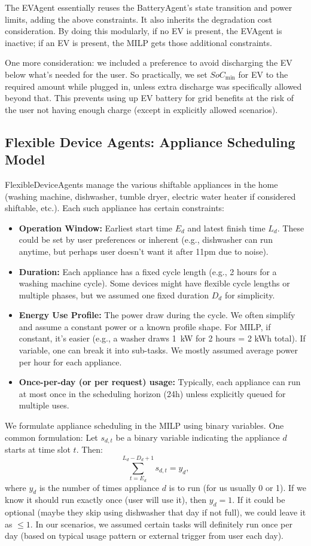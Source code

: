 \documentclass[12pt,a4paper]{article}
\begin{document}
The EVAgent essentially reuses the BatteryAgent’s state transition and power limits, adding the above constraints. It also inherits the degradation cost consideration. By doing this modularly, if no EV is present, the EVAgent is inactive; if an EV is present, the MILP gets those additional constraints.

One more consideration: we included a preference to avoid discharging the EV below what’s needed for the user. So practically, we set $SoC_{\text{min}}$ for EV to the required amount while plugged in, unless extra discharge was specifically allowed beyond that. This prevents using up EV battery for grid benefits at the risk of the user not having enough charge (except in explicitly allowed scenarios).

\subsection{Flexible Device Agents: Appliance Scheduling Model}
FlexibleDeviceAgents manage the various shiftable appliances in the home (washing machine, dishwasher, tumble dryer, electric water heater if considered shiftable, etc.). Each such appliance has certain constraints:
\begin{itemize}
    \item \textbf{Operation Window:} Earliest start time $E_d$ and latest finish time $L_d$. These could be set by user preferences or inherent (e.g., dishwasher can run anytime, but perhaps user doesn’t want it after 11pm due to noise).
    \item \textbf{Duration:} Each appliance has a fixed cycle length (e.g., 2 hours for a washing machine cycle). Some devices might have flexible cycle lengths or multiple phases, but we assumed one fixed duration $D_d$ for simplicity.
    \item \textbf{Energy Use Profile:} The power draw during the cycle. We often simplify and assume a constant power or a known profile shape. For MILP, if constant, it’s easier (e.g., a washer draws 1~kW for 2 hours = 2 kWh total). If variable, one can break it into sub-tasks. We mostly assumed average power per hour for each appliance.
    \item \textbf{Once-per-day (or per request) usage:} Typically, each appliance can run at most once in the scheduling horizon (24h) unless explicitly queued for multiple uses.
\end{itemize}

We formulate appliance scheduling in the MILP using binary variables. One common formulation:
Let $s_{d,t}$ be a binary variable indicating the appliance $d$ starts at time slot $t$. Then:
\[
\sum_{t=E_d}^{L_d - D_d + 1} s_{d,t} = y_d,
\] 
where $y_d$ is the number of times appliance $d$ is to run (for us usually 0 or 1). If we know it should run exactly once (user will use it), then $y_d=1$. If it could be optional (maybe they skip using dishwasher that day if not full), we could leave it as $\le 1$. In our scenarios, we assumed certain tasks will definitely run once per day (based on typical usage pattern or external trigger from user each day).
\end{document}
